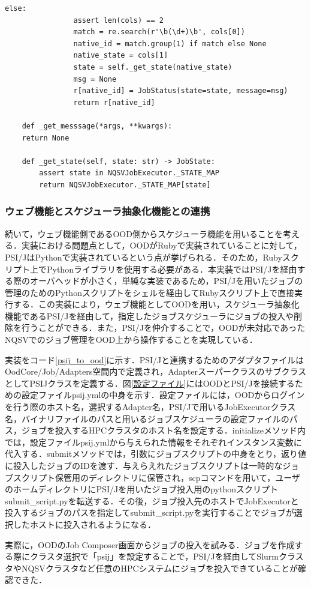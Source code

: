 \begin{lstlisting}[caption=ジョブの状態取得メソッド, label=get_status_now]
            else:
                assert len(cols) == 2
                match = re.search(r'\b(\d+)\b', cols[0])
                native_id = match.group(1) if match else None
                native_state = cols[1]
                state = self._get_state(native_state)
                msg = None
                r[native_id] = JobStatus(state=state, message=msg)
                return r[native_id]
    
    def _get_messsage(*args, **kwargs):  
    return None
    
    def _get_state(self, state: str) -> JobState: 
        assert state in NQSVJobExecutor._STATE_MAP
        return NQSVJobExecutor._STATE_MAP[state]
\end{lstlisting}


\subsubsection{ウェブ機能とスケジューラ抽象化機能との連携}
続いて，ウェブ機能側であるOOD側からスケジューラ機能を用いることを考える．実装における問題点として，OODがRubyで実装されていることに対して，PSI/JはPythonで実装されているという点が挙げられる\cite{cite9}\cite{cite10}．そのため，Rubyスクリプト上でPythonライブラリを使用する必要がある．本実装ではPSI/Jを経由する際のオーバヘッドが小さく，単純な実装であるため，PSI/Jを用いたジョブの管理のためのPythonスクリプトをシェルを経由してRubyスクリプト上で直接実行する．この実装により，ウェブ機能としてOODを用い，スケジューラ抽象化機能であるPSI/Jを経由して，指定したジョブスケジューラにジョブの投入や削除を行うことができる．また，PSI/Jを仲介することで，OODが未対応であったNQSVでのジョブ管理をOOD上から操作することを実現している．\par
実装をコード\ref{psij_to_ood}に示す．PSI/Jと連携するためのアダプタファイルはOodCore/Job/Adapters空間内で定義され，AdapterスーパークラスのサブクラスとしてPSIJクラスを定義する．図\ref{設定ファイル}にはOODとPSI/Jを接続するための設定ファイルpsij.ymlの中身を示す．設定ファイルには，OODからログインを行う際のホスト名，選択するAdapter名，PSI/Jで用いるJobExecutorクラス名，バイナリファイルのパスと用いるジョブスケジューラの設定ファイルのパス，ジョブを投入するHPCクラスタのホスト名を設定する．initializeメソッド内では，設定ファイルpsij.ymlから与えられた情報をそれぞれインスタンス変数に代入する．submitメソッドでは，引数にジョブスクリプトの中身をとり，返り値に投入したジョブのIDを渡す．与えらえれたジョブスクリプトは一時的なジョブスクリプト保管用のディレクトリに保管され，scpコマンドを用いて，ユーザのホームディレクトリにPSI/Jを用いたジョブ投入用のpythonスクリプトsubmit\_script.pyを転送する．その後，ジョブ投入先のホストでJobExecutorと投入するジョブのパスを指定してsubmit\_script.pyを実行することでジョブが選択したホストに投入されるようになる．\par
実際に，OODのJob Composer画面からジョブの投入を試みる．ジョブを作成する際にクラスタ選択で「psij」を設定することで，PSI/Jを経由してSlurmクラスタやNQSVクラスタなど任意のHPCシステムにジョブを投入できていることが確認できた．\par

